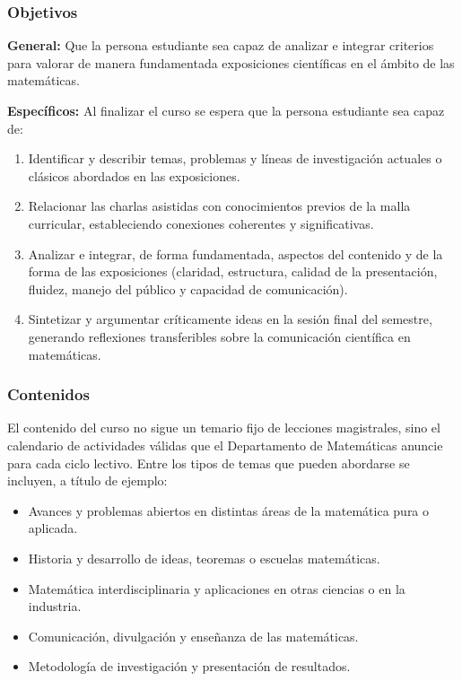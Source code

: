 \begin{refsection}
\subsubsection*{Objetivos}

\textbf{General:} Que la persona estudiante sea capaz de analizar e integrar criterios para valorar de manera fundamentada exposiciones científicas en el ámbito de las matemáticas.

\textbf{Específicos:} Al finalizar el curso se espera que la persona estudiante sea capaz de:

\begin{enumerate}

\item Identificar y describir temas, problemas y líneas de investigación actuales o clásicos abordados en las exposiciones.

\item Relacionar las charlas asistidas con conocimientos previos de la malla curricular, estableciendo conexiones coherentes y significativas.

\item Analizar e integrar, de forma fundamentada, aspectos del contenido y de la forma de las exposiciones (claridad, estructura, calidad de la presentación, fluidez, manejo del público y capacidad de comunicación).

\item Sintetizar y argumentar críticamente ideas en la sesión final del semestre, generando reflexiones transferibles sobre la comunicación científica en matemáticas.
\end{enumerate}

\subsubsection*{Contenidos}

El contenido del curso no sigue un temario fijo de lecciones magistrales, sino el calendario de actividades válidas que el Departamento de Matemáticas anuncie para cada ciclo lectivo. Entre los tipos de temas que pueden abordarse se incluyen, a título de ejemplo:

\begin{itemize}
\item Avances y problemas abiertos en distintas áreas de la matemática pura o aplicada.
\item Historia y desarrollo de ideas, teoremas o escuelas matemáticas.
\item Matemática interdisciplinaria y aplicaciones en otras ciencias o en la industria.
\item Comunicación, divulgación y enseñanza de las matemáticas.
\item Metodología de investigación y presentación de resultados.
\end{itemize}




\end{refsection}
